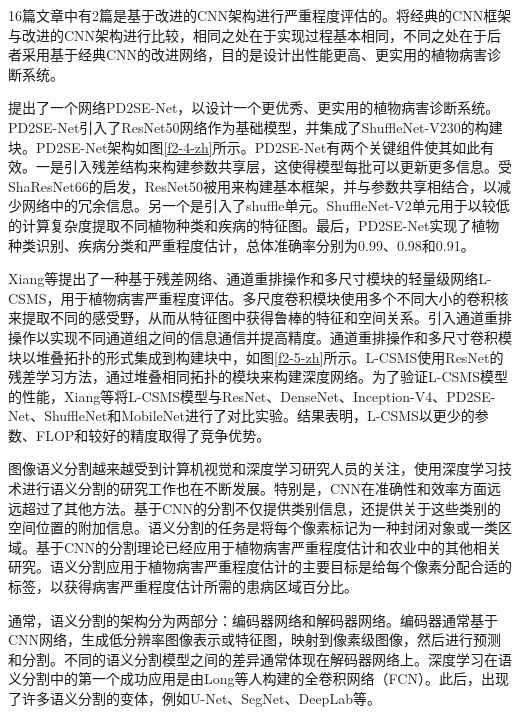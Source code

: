 16篇文章中有2篇是基于改进的CNN架构进行严重程度评估的。将经典的CNN框架与改进的CNN架构进行比较，相同之处在于实现过程基本相同，不同之处在于后者采用基于经典CNN的改进网络，目的是设计出性能更高、更实用的植物病害诊断系统。

提出了一个网络PD2SE-Net，以设计一个更优秀、更实用的植物病害诊断系统。PD2SE-Net引入了ResNet50网络作为基础模型，并集成了ShuffleNet-V230的构建块。PD2SE-Net架构如图\ref{f2-4-zh}所示。PD2SE-Net有两个关键组件使其如此有效。一是引入残差结构来构建参数共享层，这使得模型每批可以更新更多信息。受ShaResNet66的启发，ResNet50被用来构建基本框架，并与参数共享相结合，以减少网络中的冗余信息。另一个是引入了shuffle单元。ShuffleNet-V2单元用于以较低的计算复杂度提取不同植物种类和疾病的特征图。最后，PD2SE-Net实现了植物种类识别、疾病分类和严重程度估计，总体准确率分别为0.99、0.98和0.91。


Xiang等提出了一种基于残差网络、通道重排操作和多尺寸模块的轻量级网络L-CSMS，用于植物病害严重程度评估。多尺度卷积模块使用多个不同大小的卷积核来提取不同的感受野，从而从特征图中获得鲁棒的特征和空间关系。引入通道重排操作以实现不同通道组之间的信息通信并提高精度。通道重排操作和多尺寸卷积模块以堆叠拓扑的形式集成到构建块中，如图\ref{f2-5-zh}所示。L-CSMS使用ResNet的残差学习方法，通过堆叠相同拓扑的模块来构建深度网络。为了验证L-CSMS模型的性能，Xiang等将L-CSMS模型与ResNet、DenseNet、Inception-V4、PD2SE-Net、ShuffleNet和MobileNet进行了对比实验。结果表明，L-CSMS以更少的参数、FLOP和较好的精度取得了竞争优势。


图像语义分割越来越受到计算机视觉和深度学习研究人员的关注，使用深度学习技术进行语义分割的研究工作也在不断发展。特别是，CNN在准确性和效率方面远远超过了其他方法。基于CNN的分割不仅提供类别信息，还提供关于这些类别的空间位置的附加信息。语义分割的任务是将每个像素标记为一种封闭对象或一类区域。基于CNN的分割理论已经应用于植物病害严重程度估计和农业中的其他相关研究。语义分割应用于植物病害严重程度估计的主要目标是给每个像素分配合适的标签，以获得病害严重程度估计所需的患病区域百分比。

通常，语义分割的架构分为两部分：编码器网络和解码器网络。编码器通常基于CNN网络，生成低分辨率图像表示或特征图，映射到像素级图像，然后进行预测和分割。不同的语义分割模型之间的差异通常体现在解码器网络上。深度学习在语义分割中的第一个成功应用是由Long等人构建的全卷积网络（FCN）。此后，出现了许多语义分割的变体，例如U-Net、SegNet、DeepLab等。

